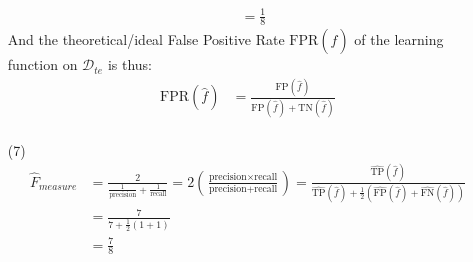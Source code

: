 \documentclass[12pt,a4paper]{article}
\begin{document}
\begin{enumerate}
\begin{align*}
								&= \frac{1}{8}
			\end{align*}
			And the  theoretical/ideal False Positive Rate $\text{FPR}(\widehat{f}) $ of the learning function  on $\mathscr{D}_{te} $ is thus: 
		\begin{align*}
						\text{FPR}(\widehat{f}) &=  \frac{\text{FP} (\widehat{f}) }{  \text{FP} (\widehat{f})  + \text{TN} (\widehat{f})  }\\
			\end{align*}
	\item[(7)] 
				\begin{align*}
							\widehat{F}_{measure} &= \frac{2}{    \frac{1}{ \text{precision} }  +  \frac{1}{ \text{recall} } } =  2 (  \frac{ \text{precision} \times \text{recall}  }{ \text{precision}  + \text{recall}} ) =   \frac{\widehat{ \text{TP} }(\widehat{f}) }{  \widehat{ \text{TP} }(\widehat{f})  + \frac{1}{2} (    \widehat{ \text{FP} }(\widehat{f}) +  \widehat{ \text{FN} }(\widehat{f}) )    }\\
							&= \frac{7} {   7 + \frac{1}{2} ( 1+1 ) }\\
							&=  \frac{7}{8}
				\end{align*}
\end{enumerate}
\end{document}
